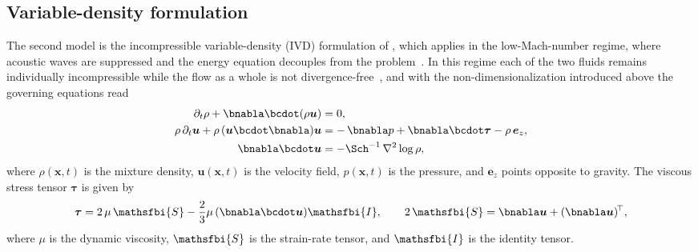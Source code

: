 \subsection{Variable-density formulation}
\label{sec:vd_equation}
The second model is the incompressible variable-density (IVD) formulation of \citet{sandoval-1995}, which applies in the low-Mach-number regime, where acoustic waves are suppressed and the energy equation decouples from the problem~\citep{livescu-ristorcelli-2007}. In this regime each of the two fluids remains individually incompressible while the flow as a whole is not divergence-free~\citep{livescu-2013}, and with the non-dimensionalization introduced above the governing equations read
\begin{subequations}
    \label{eq:vd_nl_continuous}
    \begin{align}
        \label{eq:vd_nl_continuous_continuity}
        \partial_t \rho + \bnabla\bcdot(\rho \boldsymbol{u}) &= 0, \\
        \label{eq:vd_nl_continuous_momentum}
        \rho\,\partial_t \boldsymbol{u} + \rho\,(\boldsymbol{u}\bcdot\bnabla)\boldsymbol{u} &= -\,\bnabla p + \bnabla\bcdot\boldsymbol{\tau} - \rho\,\boldsymbol{e}_z, \\
        \label{eq:vd_nl_continuous_divergence}
        \bnabla \bcdot \boldsymbol{u} &= -\Sch^{-1}\,\nabla^2 \log\rho,
    \end{align}
\end{subequations}
where \(\rho(\boldsymbol{x},t)\) is the mixture density, \(\boldsymbol{u}(\boldsymbol{x},t)\) is the
velocity field, \(p(\boldsymbol{x},t)\) is the pressure, and \(\boldsymbol{e}_z\) points
opposite to gravity. The viscous stress tensor \(\boldsymbol{\tau}\) is given by
\begin{equation}
    \label{eq:vd_stress_tensor}
    \boldsymbol{\tau} =  2\,\mu\,\mathsfbi{S} - \frac{2}{3}\mu\,(\bnabla\bcdot\boldsymbol{u})\mathsfbi{I}, \qquad 2\,\mathsfbi{S} = \bnabla\boldsymbol{u} + (\bnabla\boldsymbol{u})^{\!\top},
\end{equation}
where \(\mu\) is the dynamic viscosity, \(\mathsfbi{S}\) is the strain-rate tensor, and
\(\mathsfbi{I}\) is the identity tensor.



